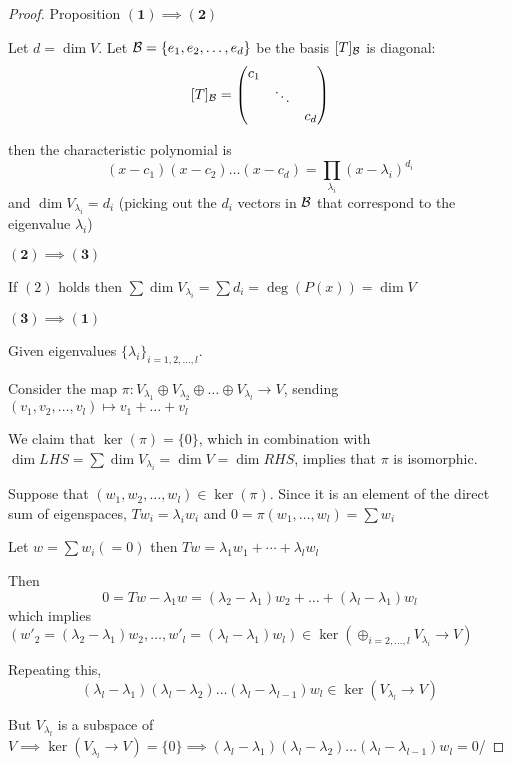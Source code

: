\begin{proof} {Proposition}
    \(\mathbf{(1) \implies (2)}\)

    Let \(d = \dim V\). Let \(\mathcal{B} = \{e_1, e_2, \dots, e_d\}\) be the basis \st \([T]_{\mathcal{B}}\) is diagonal: \[
        [T]_{\mathcal{B}} = \begin{pmatrix}
            c_1 &        &     \\
                & \ddots &     \\
                &        & c_d
        \end{pmatrix}
    \]

    then the characteristic polynomial is \[
        (x-c_1)(x-c_2) \dots (x-c_d) = \prod_{\lambda_i} (x - \lambda_i)^{d_i}
    \]
    and \(\dim V_{\lambda_i} = d_i\) (picking out the \(d_i\) vectors in \(\mathcal{B}\) that correspond to the eigenvalue \(\lambda_i\))

    \(\mathbf{(2) \implies (3)}\)

    If \((2)\) holds then \(\sum \dim V_{\lambda_i} = \sum d_i = \deg (P(x)) = \dim V\)

    \(\mathbf{(3) \implies (1)}\)

    Given eigenvalues \(\{\lambda_i\}_{i = 1, 2, \dots, l}\).

    Consider the map \(\pi: V_{\lambda_1} \oplus V_{\lambda_2} \oplus \dots \oplus V_{\lambda_l} \to V\), sending \((v_1, v_2, \dots, v_l) \mapsto v_1 + \dots + v_l\)

    We claim that \(\ker(\pi) = \{0\}\), which in combination with \(\dim LHS = \sum \dim V_{\lambda_i} = \dim V = \dim RHS\), implies that \(\pi\) is isomorphic.

    Suppose that \((w_1, w_2, \dots, w_l) \in \ker(\pi)\). Since it is an element of the direct sum of eigenspaces, \(Tw_i = \lambda_i w_i\) and \(0 = \pi(w_1, \dots, w_l) = \sum w_i  \)

    Let \(w = \sum w_i (=0)\) then \(T w = \lambda_1 w_1 + \cdots + \lambda_l w_l\)

    Then \[
        0 = Tw - \lambda_1 w = (\lambda_2 - \lambda_1) w_2 + \dots + (\lambda_l - \lambda_1) w_l
    \]
    which implies \((w'_2  = (\lambda_2 - \lambda_1) w_2, \dots , w'_l = (\lambda_l - \lambda_1) w_l ) \in \ker(\oplus_{i=2, \dots, l} V_{\lambda_i} \to V)\)

    Repeating this, \[
        (\lambda_l - \lambda_1)(\lambda_l - \lambda_2) \dots (\lambda_l - \lambda_{l-1}) w_l \in \ker (V_{\lambda_l} \to V)
    \]

    But \(V_{\lambda_l}\)    is a subspace of \(V \implies \ker(V_{\lambda_l}\to V )= \{0\} \implies (\lambda_l - \lambda_1)(\lambda_l - \lambda_2) \dots (\lambda_l - \lambda_{l-1}) w_l = 0\)/


\end{proof}
